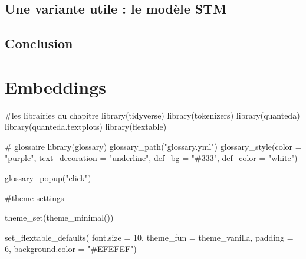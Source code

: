 \documentclass[
  letterpaper,
  DIV=11,
  numbers=noendperiod]{scrreprt}
\newenvironment{Shaded}{\begin{snugshade}}{\end{snugshade}}
\newcommand{\AttributeTok}[1]{\textcolor[rgb]{0.40,0.45,0.13}{#1}}
\newcommand{\CommentTok}[1]{\textcolor[rgb]{0.37,0.37,0.37}{#1}}
\newcommand{\DecValTok}[1]{\textcolor[rgb]{0.68,0.00,0.00}{#1}}
\newcommand{\FunctionTok}[1]{\textcolor[rgb]{0.28,0.35,0.67}{#1}}
\newcommand{\NormalTok}[1]{\textcolor[rgb]{0.00,0.23,0.31}{#1}}
\newcommand{\StringTok}[1]{\textcolor[rgb]{0.13,0.47,0.30}{#1}}
\begin{document}
\section{Une variante utile : le modèle
STM}\label{une-variante-utile-le-moduxe8le-stm}

\section{Conclusion}\label{conclusion-9}


\chapter{Embeddings}\label{embeddings}

\begin{Shaded}
\begin{Highlighting}[]
\CommentTok{\#les librairies du chapitre}
\FunctionTok{library}\NormalTok{(tidyverse)}
\FunctionTok{library}\NormalTok{(tokenizers)}
\FunctionTok{library}\NormalTok{(quanteda)}
\FunctionTok{library}\NormalTok{(quanteda.textplots)}
\FunctionTok{library}\NormalTok{(flextable)}

\CommentTok{\# glossaire}
\FunctionTok{library}\NormalTok{(glossary)}
\FunctionTok{glossary\_path}\NormalTok{(}\StringTok{"glossary.yml"}\NormalTok{)}
\FunctionTok{glossary\_style}\NormalTok{(}\AttributeTok{color =} \StringTok{"purple"}\NormalTok{, }
               \AttributeTok{text\_decoration =} \StringTok{"underline"}\NormalTok{,}
               \AttributeTok{def\_bg =} \StringTok{"\#333"}\NormalTok{,}
               \AttributeTok{def\_color =} \StringTok{"white"}\NormalTok{)}
\end{Highlighting}
\end{Shaded}

\begin{Shaded}
\begin{Highlighting}[]
\FunctionTok{glossary\_popup}\NormalTok{(}\StringTok{"click"}\NormalTok{)}

\CommentTok{\#theme settings}

\FunctionTok{theme\_set}\NormalTok{(}\FunctionTok{theme\_minimal}\NormalTok{()) }

\FunctionTok{set\_flextable\_defaults}\NormalTok{(}
  \AttributeTok{font.size =} \DecValTok{10}\NormalTok{, }\AttributeTok{theme\_fun =}\NormalTok{ theme\_vanilla,}
  \AttributeTok{padding =} \DecValTok{6}\NormalTok{,}
  \AttributeTok{background.color =} \StringTok{"\#EFEFEF"}\NormalTok{)}
\end{Highlighting}
\end{Shaded}
\end{document}
